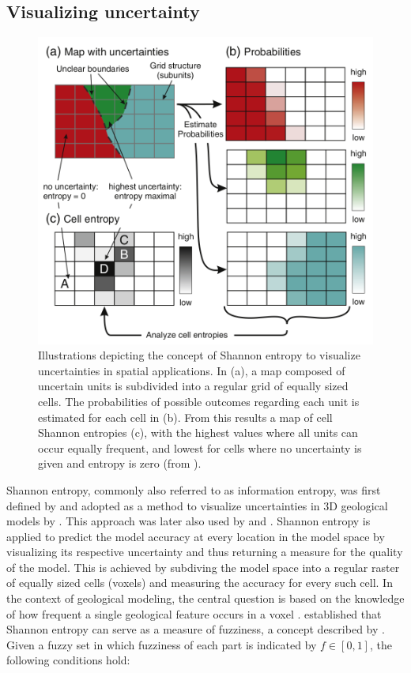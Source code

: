         \subsection{Visualizing uncertainty}\label{sec:shannon_entropy}
        \begin{figure}
	        \centering
	        \includegraphics[width=1\textwidth]{Figures/information_entropy.png}
	        \caption{Illustrations depicting the concept of Shannon entropy to visualize uncertainties in spatial applications. In (a), a map composed of uncertain units is subdivided into a regular grid of equally sized cells. The probabilities of possible outcomes regarding each unit is estimated for each cell in (b). From this results a map of cell Shannon entropies (c), with the highest values where all units can occur equally frequent, and lowest for cells where no uncertainty is given and entropy is zero (from \citet{wellmann2012uncertainties}).}\label{fig:information_entropy}
        \end{figure}
        Shannon entropy, commonly also referred to as information entropy, was first defined by \citet{shannon1948mathematical} and adopted as a method to visualize uncertainties in 3D geological models by \citet{wellmann2012uncertainties}. This approach was later also used by \citet{delaVarga2016} and \citet{schaaf2017}. Shannon entropy is applied to predict the model accuracy at every location in the model space by visualizing its respective uncertainty and thus returning a measure for the quality of the model. This is achieved by subdiving the model space into a regular raster of equally sized cells (voxels) and measuring the accuracy for every such cell. In the context of geological modeling, the central question is based on the knowledge of how frequent a single geological feature occurs in a voxel \citep{wellmann2012uncertainties}. \citet{de1972definition} established that Shannon entropy can serve as a measure of fuzziness, a concept described by \citet{zadeh1965fuzzy}. Given a fuzzy set in which fuzziness of each part is indicated by $f\in [0,1]$, the following conditions hold:
